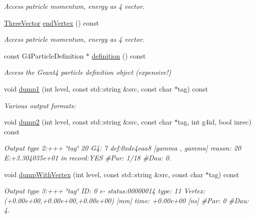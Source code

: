 \begin{DoxyCompactItemize}
\begin{DoxyCompactList}\small\item\em Access patricle momentum, energy as 4 vector. \end{DoxyCompactList}\item 
\hyperlink{class_d_d4hep_1_1_simulation_1_1_geant4_particle_handle_a8aabe9ad3397b25aae653c42ec82021a}{Three\+Vector} \hyperlink{class_d_d4hep_1_1_simulation_1_1_geant4_particle_handle_a8ac91f3ece72e2f3ff5a5dc0c992d1dc}{end\+Vertex} () const
\begin{DoxyCompactList}\small\item\em Access patricle momentum, energy as 4 vector. \end{DoxyCompactList}\item 
const G4\+Particle\+Definition $\ast$ \hyperlink{class_d_d4hep_1_1_simulation_1_1_geant4_particle_handle_ab8ba7892c3676dafc9a0b5eae3841f43}{definition} () const
\begin{DoxyCompactList}\small\item\em Access the Geant4 particle definition object (expensive!) \end{DoxyCompactList}\item 
void \hyperlink{class_d_d4hep_1_1_simulation_1_1_geant4_particle_handle_a437a325fa9f57b56a34e3fb52deba62d}{dump1} (int level, const std\+::string \&src, const char $\ast$tag) const
\begin{DoxyCompactList}\small\item\em Various output formats\+: \end{DoxyCompactList}\item 
void \hyperlink{class_d_d4hep_1_1_simulation_1_1_geant4_particle_handle_a75abe8ec76652163d20b7746cd580f57}{dump2} (int level, const std\+::string \&src, const char $\ast$tag, int g4id, bool inrec) const
\begin{DoxyCompactList}\small\item\em Output type 2\+:+++ \char`\"{}tag\char`\"{} 20 G4\+: 7 def\+:0xde4eaa8 \mbox{[}gamma , gamma\mbox{]} reason\+: 20 E\+:+3.304035e+01 in record\+:Y\+ES \#Par\+: 1/18 \#Dau\+: 0. \end{DoxyCompactList}\item 
void \hyperlink{class_d_d4hep_1_1_simulation_1_1_geant4_particle_handle_a1a804b13781ed8b9281883e8d36d37d9}{dump\+With\+Vertex} (int level, const std\+::string \&src, const char $\ast$tag) const
\begin{DoxyCompactList}\small\item\em Output type 3\+:+++ \char`\"{}tag\char`\"{} ID\+: 0 e-\/ status\+:00000014 type\+: 11 Vertex\+:(+0.00e+00,+0.00e+00,+0.00e+00) \mbox{[}mm\mbox{]} time\+: +0.00e+00 \mbox{[}ns\mbox{]} \#Par\+: 0 \#Dau\+: 4. \end{DoxyCompactList}\item 

\end{DoxyCompactItemize}
